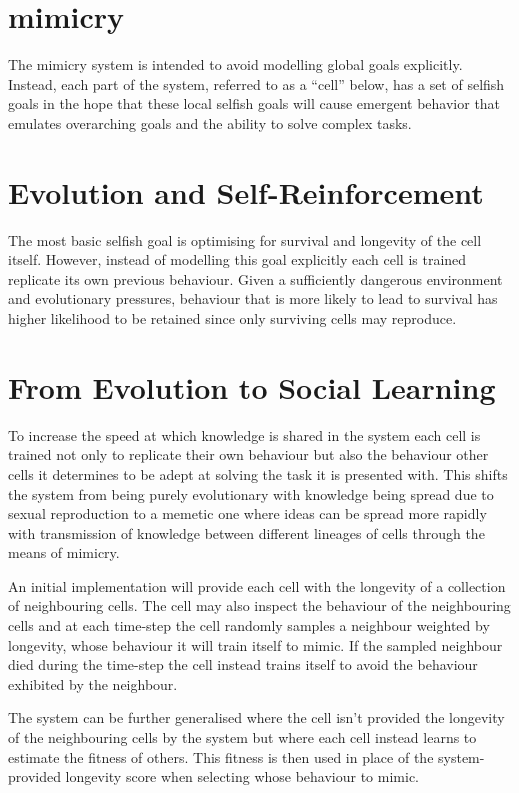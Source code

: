 \documentclass[a4paper]{article}
\begin{document}
\section{mimicry}

The mimicry system is intended to avoid modelling global goals explicitly.
%
Instead, each part of the system, referred to as a ``cell'' below, has a set of selfish goals in the hope that these local selfish goals will cause emergent behavior that emulates overarching goals and the ability to solve complex tasks.

\section{Evolution and Self-Reinforcement}

The most basic selfish goal is optimising for survival and longevity of the cell itself. 
%
However, instead of modelling this goal explicitly each cell is trained replicate its own previous behaviour.
%
Given a sufficiently dangerous environment and evolutionary pressures, behaviour that is more likely to lead to survival has higher likelihood to be retained since only surviving cells may reproduce.

\section{From Evolution to Social Learning}

To increase the speed at which knowledge is shared in the system each cell is trained not only to replicate their own behaviour but also the behaviour other cells it determines to be adept at solving the task it is presented with.
%
This shifts the system from being purely evolutionary with knowledge being spread due to sexual reproduction to a memetic one where ideas can be spread more rapidly with transmission of knowledge between different lineages of cells through the means of mimicry.

An initial implementation will provide each cell with the longevity of a collection of neighbouring cells.
%
The cell may also inspect the behaviour of the neighbouring cells and at each time-step the cell randomly samples a neighbour weighted by longevity, whose behaviour it will train itself to mimic.
%
If the sampled neighbour died during the time-step the cell instead trains itself to avoid the behaviour exhibited by the neighbour.

The system can be further generalised where the cell isn't provided the longevity of the neighbouring cells by the system but where each cell instead learns to estimate the fitness of others.
%
This fitness is then used in place of the system-provided longevity score when selecting whose behaviour to mimic.
\end{document}
